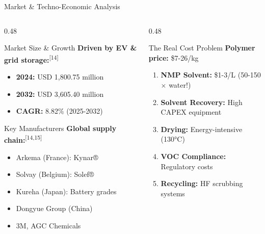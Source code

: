 \documentclass[aspectratio=169]{beamer}
\begin{document}
\begin{frame}{Market \& Techno-Economic Analysis}
    \begin{columns}[T]
        \begin{column}{0.48\textwidth}
            \begin{block}{Market Size \& Growth}
                \small \textbf{Driven by EV \& grid storage:}\textsuperscript{[14]}
                \begin{itemize}\footnotesize
                    \item \textbf{2024:} USD 1,800.75 million
                    \item \textbf{2032:} USD 3,605.40 million
                    \item \textbf{CAGR:} 8.82\% (2025-2032)
                \end{itemize}
            \end{block}
            
            \begin{block}{Key Manufacturers}
                \footnotesize \textbf{Global supply chain:}\textsuperscript{[14,15]}
                \begin{itemize}\footnotesize
                    \item Arkema (France): Kynar®
                    \item Solvay (Belgium): Solef®
                    \item Kureha (Japan): Battery grades
                    \item Dongyue Group (China)
                    \item 3M, AGC Chemicals
                \end{itemize}
            \end{block}
        \end{column}
        
        \begin{column}{0.48\textwidth}
            \begin{alertblock}{The Real Cost Problem}
                \small \textbf{Polymer price:} \$7-26/kg
                \begin{enumerate}\footnotesize
                    \item \textbf{NMP Solvent:} \$1-3/L (50-150$\times$ water!)
                    \item \textbf{Solvent Recovery:} High CAPEX equipment
                    \item \textbf{Drying:} Energy-intensive (130\si{\celsius})
                    \item \textbf{VOC Compliance:} Regulatory costs
                    \item \textbf{Recycling:} HF scrubbing systems
                \end{enumerate}
            \end{alertblock}
            

\end{column}
\end{columns}
\end{frame}
\end{document}
